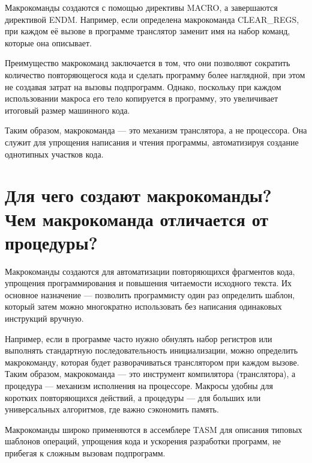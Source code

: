 Макрокоманды создаются с помощью директивы MACRO, а завершаются директивой ENDM. Например, если определена макрокоманда CLEAR_REGS, при каждом её вызове в программе транслятор заменит имя на набор команд, которые она описывает.

Преимущество макрокоманд заключается в том, что они позволяют сократить количество повторяющегося кода и сделать программу более наглядной, при этом не создавая затрат на вызовы подпрограмм. Однако, поскольку при каждом использовании макроса его тело копируется в программу, это увеличивает итоговый размер машинного кода.

Таким образом, макрокоманда — это механизм транслятора, а не процессора. Она служит для упрощения написания и чтения программы, автоматизируя создание однотипных участков кода.

\section{Для чего создают макрокоманды? Чем макрокоманда отличается от процедуры?}

Макрокоманды создаются для автоматизации повторяющихся фрагментов кода, упрощения программирования и повышения читаемости исходного текста. Их основное назначение — позволить программисту один раз определить шаблон, который затем можно многократно использовать без написания одинаковых инструкций вручную.

Например, если в программе часто нужно обнулять набор регистров или выполнять стандартную последовательность инициализации, можно определить макрокоманду, которая будет разворачиваться транслятором при каждом вызове.
Таким образом, макрокоманда — это инструмент компилятора (транслятора), а процедура — механизм исполнения на процессоре. Макросы удобны для коротких повторяющихся действий, а процедуры — для больших или универсальных алгоритмов, где важно сэкономить память.

Макрокоманды широко применяются в ассемблере TASM для описания типовых шаблонов операций, упрощения кода и ускорения разработки программ, не прибегая к сложным вызовам подпрограмм.

\endinput
